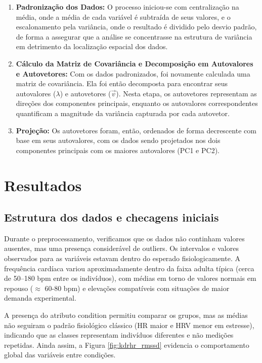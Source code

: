 \documentclass[conference]{IEEEtran}
\begin{document}
\begin{enumerate}
    \item \textbf{Padronização dos Dados:} O processo iniciou-se com centralização na média, onde a média de cada variável é subtraída de seus valores, e o escalonamento pela variância, onde o resultado é dividido pelo desvio padrão, de forma a  assegurar que a análise se concentrasse na estrutura de variância em detrimento da localização espacial dos dados.
    \item \textbf{Cálculo da Matriz de Covariância e Decomposição em Autovalores e Autovetores:} Com os dados padronizados, foi novamente calculada uma matriz de covariância. Ela foi então decomposta para encontrar seus autovalores ($\lambda$) e autovetores ($\vec{v}$). Nesta etapa, os autovetores representam as direções dos componentes principais, enquanto os autovalores correspondentes quantificam a magnitude da variância capturada por cada autovetor.

    \item \textbf{Projeção:} Os autovetores foram, então, ordenados de forma decrescente com base em seus autovalores, com os dados sendo projetados nos dois componentes principais com os maiores autovalores (PC1 e PC2).
\end{enumerate}

\section{Resultados}
\subsection{Estrutura dos dados e checagens iniciais}

Durante o preprocessamento, verificamos que os dados não continham valores ausentes, mas uma presença considerável de outliers. Os intervalos e valores observados para as variáveis estavam dentro do esperado fisiologicamente. A frequência cardíaca variou aproximadamente dentro da faixa adulta típica (cerca de 50–180 bpm entre os indivíduos), com médias em torno de valores normais em repouso ($\approx$ 60-80 bpm) e elevações compatíveis com situações de maior demanda experimental.

A presença do atributo condition permitiu comparar os grupos, mas as médias não seguiram o padrão fisiológico clássico (HR maior e HRV menor em estresse), indicando que as classes representam indivíduos diferentes e não medições repetidas. Ainda assim, a Figura \ref{fig:kdrhr_rmssd} evidencia o comportamento global das variáveis entre condições.
\end{document}
